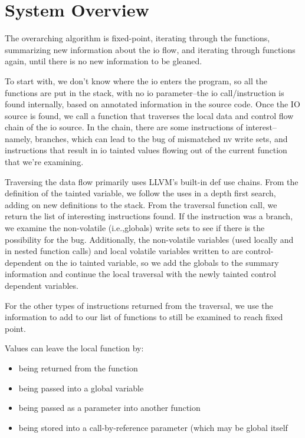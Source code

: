 \section{System Overview}

The overarching algorithm is fixed-point, iterating through the functions, summarizing new information about the io flow, and iterating through functions again, until there is no new information to be gleaned. 
	
To start with, we don't know where the io enters the program, so all the functions are put in the stack, with no io parameter--the io call/instruction is found internally, based on annotated information in the source code. Once the IO source is found, we call a function that traverses the local data and control flow chain of the io source. In the chain, there are some instructions of interest--namely, branches, which can lead to the bug of mismatched nv write sets, and instructions that result in io tainted values flowing out of the current function that we're examining. 
	
Traversing the data flow primarily uses LLVM's built-in def use chains. From the definition of the tainted variable, we follow the uses in a depth first search, adding on new definitions to the stack.  
From the traversal function call, we return the list of interesting instructions found. If the instruction was a branch, we examine the non-volatile (i.e.,globals) write sets to see if there is the possibility for the bug. Additionally, the non-volatile variables (used locally and in nested function calls) and local volatile variables written to are control-dependent on the io tainted variable, so we add the globals to the summary information and continue the local traversal with the newly tainted control dependent variables.
	
For the other types of instructions returned from the traversal, we use the information to add to our list of functions to still be examined to reach fixed point. 
	
Values can leave the local function by: 
\begin{itemize}
\item{being returned from the function} 
\item{being passed into a global variable} 
\item{being passed as a parameter into another function}
\item{being stored into a call-by-reference parameter (which may be global itself}
\end{itemize}	
	
